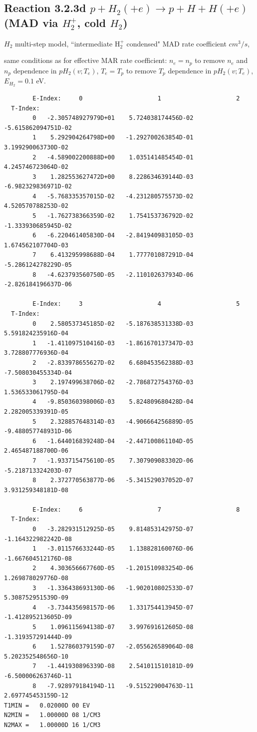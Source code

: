 \documentclass[12pt,dvipdfmx]{article}
\begin{document}
\subsection{
Reaction 3.2.3d   $p + H_2 (+e)   \rightarrow p + H + H (+e) $ (MAD via $H_2^+$, cold $H_2$)
}

$H_2$ multi-step model, ``intermediate H$_2^+$ condensed" MAD rate coefficient $cm^3/s$,

same conditions as for effective MAR rate coefficient: $n_e=n_p$ to remove $n_e$ and $n_p$ dependence in $pH_2(v;T_e)$,
$T_e=T_p$ to remove $T_p$ dependence in $pH_2(v;T_e)$,  $E_{H_2}=0.1$ eV.

\begin{small}\begin{verbatim}
        E-Index:     0                     1                     2
  T-Index:
        0   -2.305748927979D+01    5.724038174456D-02   -5.615862094751D-02
        1    5.292904264798D+00   -1.292700263854D-01    3.199290063730D-02
        2   -4.589002200888D+00    1.035141485454D-01    4.245746723064D-02
        3    1.282553627472D+00    8.228634639144D-03   -6.982329836971D-02
        4   -5.768335357015D-02   -4.231280575573D-02    4.520570788253D-02
        5   -1.762738366359D-02    1.754153736792D-02   -1.333930685945D-02
        6   -6.220461405830D-04   -2.841940983105D-03    1.674562107704D-03
        7    6.413295998688D-04    1.777701087291D-04   -5.286124278229D-05
        8   -4.623793560750D-05   -2.110102637934D-06   -2.826184196637D-06

        E-Index:     3                     4                     5
  T-Index:
        0    2.580537345185D-02   -5.187638531338D-03    5.591824235916D-04
        1   -1.411097510416D-03   -1.861670137347D-03    3.728807776936D-04
        2   -2.833978655627D-02    6.680453562388D-03   -7.508030455334D-04
        3    2.197499638706D-02   -2.786872754376D-03    1.536533061795D-04
        4   -9.850360398006D-03    5.824809680428D-04    2.282005339391D-05
        5    2.328857648314D-03   -4.906664256889D-05   -9.488057748931D-06
        6   -1.644016839248D-04   -2.447100861104D-05    2.465487188700D-06
        7   -1.933715475610D-05    7.307909083302D-06   -5.218713324203D-07
        8    2.372770563877D-06   -5.341529037052D-07    3.931259348181D-08

        E-Index:     6                     7                     8
  T-Index:
        0   -3.282931512925D-05    9.814853142975D-07   -1.164322982242D-08
        1   -3.011576633244D-05    1.138828160076D-06   -1.667604512176D-08
        2    4.303656667760D-05   -1.201510983254D-06    1.269878029776D-08
        3   -1.336438693130D-06   -1.902010802533D-07    5.308752951539D-09
        4   -3.734435698157D-06    1.331754413945D-07   -1.412895213605D-09
        5    1.096115694138D-07    3.997691612605D-08   -1.319357291444D-09
        6    1.527860379159D-07   -2.055626589064D-08    5.202352548656D-10
        7   -1.441930896339D-08    2.541011510181D-09   -6.500006263746D-11
        8   -7.928979184194D-11   -9.515229004763D-11    2.697745453159D-12
T1MIN =   0.02000D 00 EV
N2MIN =   1.00000D 08 1/CM3
N2MAX =   1.00000D 16 1/CM3


\end{verbatim}
\end{small}
\end{document}
